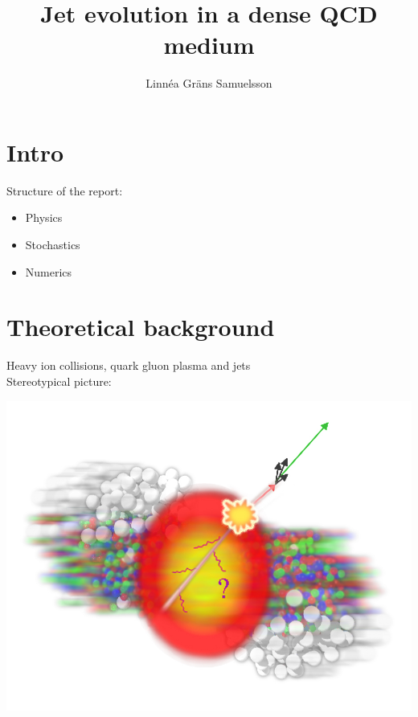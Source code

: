 \documentclass[pstricks,mathserif]{beamer}
\title{Jet evolution in a dense QCD medium}
\author{Linnéa Gräns Samuelsson}
\institute %
{
  Internship at CEA Saclay\\
  Supervisors: Edmond Iancu and Gregory Soyez
}
\begin{document}
\frame{\titlepage}


\section{Intro}


\begin{frame}

Structure of the report:

\begin{itemize}
\item Physics
\item Stochastics
\item Numerics
\end{itemize}

\end{frame}

\section{Theoretical background}

\begin{frame}

Heavy ion collisions, quark gluon plasma and jets\\
Stereotypical picture:

\begin{center}
\includegraphics[width=0.7\linewidth]{jet-quenching.jpg}
\end{center}

\end{frame}
\end{document}
